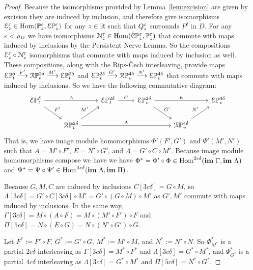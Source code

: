 \begin{proof}
  Because the isomorphisms provided by Lemma~\ref{lem:excision} are given by excision they are induced by inclusion, and therefore give isomorphisms $\mathcal{E}_z^\varepsilon \in \mathrm{Hom}(\mathbb{P}_{z}^{\varepsilon},\mathcal{E} \mathbb{P}_{z}^{\varepsilon})$ for any $z\in\mathbb{R}$ such that $Q_z^\varepsilon$ surrounds $P^\delta$ in $D$.
  For any $\varepsilon < \varrho_D$ we have isomorphisms $\mathcal{N}_z^\varepsilon\in\mathrm{Hom}(\check{\mathcal{C}}\mathbb{P}_{z}^{\varepsilon}, \mathbb{P}_{z}^{\varepsilon})$ that commute with maps induced by inclusions by the Persistent Nerve Lemma.
  So the compositions $\mathcal{E}_z^\varepsilon\circ \mathcal{N}_z^\varepsilon$ isomorphisms that commute with maps induced by inclusion as well.
  These compositions, along with the Rips-\v Cech interleaving, provide maps $\mathcal{E}\mathbb{P}_{t}^{\delta}\xrightarrow{F'}\mathcal{R}\mathbb{P}_{t}^{2\delta}\xrightarrow{M'} \mathcal{E}\mathbb{P}_{t}^{2\delta}$ and $\mathcal{E}\mathbb{P}_{v}^{2\delta}\xrightarrow{G'}\mathcal{R}\mathbb{P}_{v}^{4\delta}\xrightarrow{N'} \mathcal{E}\mathbb{P}_{v}^{4\delta}$ that commute with maps induced by inclusions.
  So we have the following commutative diagram:
  \begin{equation}
    \begin{tikzcd}
      \E\PP{t}{\delta}\arrow{rr}{A}\arrow{dr}{F'} & &
      \E\PP{t}{2\delta}\arrow{r}{C} &
      \E\PP{v}{2\delta}\arrow{rr}{E}\arrow{dr}{G'} & &
      \E\PP{v}{4\delta}\\
      & \RPP{t}{2\delta}\arrow{ur}{M'}\arrow[to=RV, "\Lambda"] & &
      & |[alias=RV]|\RPP{v}{4\delta}\arrow{ur}{N'} &
    \end{tikzcd}
  \end{equation}
  That is, we have image module homomorphisms $\Phi'(F', G')$ and $\Psi'(M', N')$ such that $A = M'\circ F'$, $E = N'\circ G'$, and $\Lambda = G'\circ C\circ M'$.
  Because image module homomorphisms compose we have we have $\Phi^* = \Phi'\circ \Phi\in\mathrm{Hom}^{2c\delta}(\mathbf{im}~\Gamma, \mathbf{im}~\Lambda)$ and $\Psi^* = \Psi\circ\Psi'\in\mathrm{Hom}^{4c\delta}(\mathbf{im}~\Lambda, \mathbf{im}~\Pi)$.

  Because $G,M,C$ are induced by inclusions $C[3c\delta] = G\circ M$, so $\Lambda[3c\delta] = G'\circ C[3c\delta]\circ M' = G'\circ (G\circ M)\circ M'$ as $G', M'$ commute with maps induced by inclusions.
  In the same way, $\Gamma[3c\delta] = M\circ (A\circ F) = M\circ (M'\circ F')\circ F$ and $\Pi[5c\delta] = N\circ (E\circ G) = N\circ (N'\circ G')\circ G$.

  Let $F^*:= F'\circ F$, $G^*:= G'\circ G$, $M^*:=M'\circ M$, and $N^*:=N'\circ N$.
  So $\Phi^*_{M^*}$ is a partial $2c\delta$ interleaving as $\Gamma[3c\delta] = M^*\circ F^*$ and $\Lambda[3c\delta] = G^*\circ M^*$, and $\Psi^*_{G^*}$ is a partial $4c\delta$ interleaving as $\Lambda[3c\delta] = G^*\circ M^*$ and $\Pi[5c\delta] = N^*\circ G^*$.
\end{proof}

